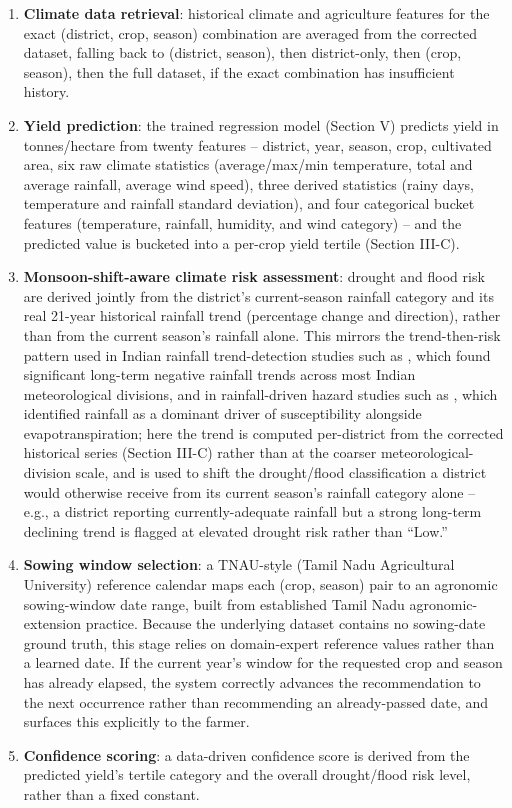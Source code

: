 \documentclass[conference]{IEEEtran}
\begin{document}
\begin{enumerate}
\item \textbf{Climate data retrieval}: historical climate and agriculture features
      for the exact (district, crop, season) combination are averaged from the
      corrected dataset, falling back to (district, season), then district-only, then
      (crop, season), then the full dataset, if the exact combination has insufficient
      history.
\item \textbf{Yield prediction}: the trained regression model (Section V) predicts
      yield in tonnes/hectare from twenty features -- district, year, season, crop,
      cultivated area, six raw climate statistics (average/max/min temperature, total
      and average rainfall, average wind speed), three derived statistics (rainy days,
      temperature and rainfall standard deviation), and four categorical bucket
      features (temperature, rainfall, humidity, and wind category) -- and the
      predicted value is bucketed into a per-crop yield tertile (Section III-C).
\item \textbf{Monsoon-shift-aware climate risk assessment}: drought and flood risk are
      derived jointly from the district's current-season rainfall category and its
      real 21-year historical rainfall trend (percentage change and direction),
      rather than from the current season's rainfall alone. This mirrors the
      trend-then-risk pattern used in Indian rainfall trend-detection studies such as
      \cite{praveen2020}, which found significant long-term negative rainfall trends
      across most Indian meteorological divisions, and in rainfall-driven hazard
      studies such as \cite{rihan2023}, which identified rainfall as a dominant driver
      of susceptibility alongside evapotranspiration; here the trend is computed
      per-district from the corrected historical series (Section III-C) rather than
      at the coarser meteorological-division scale, and is used to shift the
      drought/flood classification a district would otherwise receive from its
      current season's rainfall category alone -- e.g., a district reporting
      currently-adequate rainfall but a strong long-term declining trend is flagged at
      elevated drought risk rather than ``Low.''
\item \textbf{Sowing window selection}: a TNAU-style (Tamil Nadu Agricultural
      University) reference calendar maps each (crop, season) pair to an agronomic
      sowing-window date range, built from established Tamil Nadu agronomic-extension
      practice. Because the underlying dataset contains no sowing-date ground truth,
      this stage relies on domain-expert reference values rather than a learned date.
      If the current year's window for the requested crop and season has already
      elapsed, the system correctly advances the recommendation to the next
      occurrence rather than recommending an already-passed date, and surfaces this
      explicitly to the farmer.
\item \textbf{Confidence scoring}: a data-driven confidence score is derived from the
      predicted yield's tertile category and the overall drought/flood risk level,
      rather than a fixed constant.
\end{enumerate}
\end{document}
